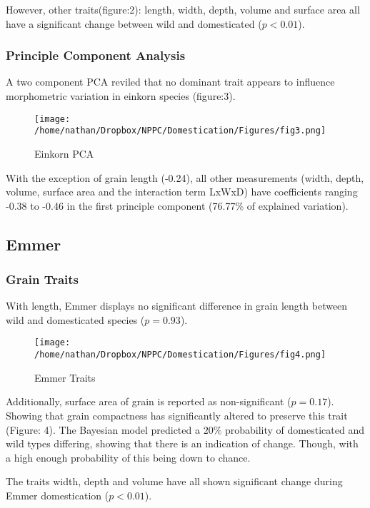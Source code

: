\documentclass[a4paper, twocolumn]{article}
\begin{document}
However, other traits(figure:2): length, width, depth, volume and surface area all have a significant change between wild and domesticated (\(p<0.01\)).


\subsubsection{Principle Component Analysis}
\label{sec:orgd9ffcf8}
A two component PCA reviled that no dominant trait appears to influence morphometric variation in einkorn species (figure:3).

\begin{figure}[htbp]
\centering
\texttt{[image: /home/nathan/Dropbox/NPPC/Domestication/Figures/fig3.png]}
\caption{\label{fig:org69ae4ca}
Einkorn PCA}
\end{figure}

With the exception of grain length (-0.24), all other measurements (width, depth, volume, surface area and the interaction term LxWxD) have coefficients ranging -0.38 to -0.46 in the first principle component (76.77\% of explained variation).

\subsection{Emmer}
\label{sec:orgf51c491}

\subsubsection{Grain Traits}
\label{sec:org013bee9}
With length, Emmer displays no significant difference in grain length between wild and domesticated species (\(p=0.93\)).

\begin{figure}[htbp]
\centering
\texttt{[image: /home/nathan/Dropbox/NPPC/Domestication/Figures/fig4.png]}
\caption{\label{fig:org6f3821f}
Emmer Traits}
\end{figure}


Additionally, surface area of grain is reported as non-significant (\(p=0.17\)). Showing that grain compactness has significantly altered to preserve this trait (Figure: 4). The Bayesian model predicted a \(20\%\) probability of domesticated and wild types differing, showing that there is an indication of change. Though, with a high enough probability of this being down to chance.


The traits width, depth and volume have all shown significant change during Emmer domestication (\(p<0.01\)).
\end{document}
